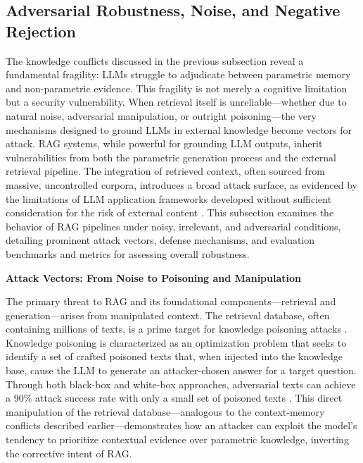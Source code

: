 \documentclass[11pt]{article}
\begin{document}
\subsection{Adversarial Robustness, Noise, and Negative Rejection}

The knowledge conflicts discussed in the previous subsection reveal a fundamental fragility: LLMs struggle to adjudicate between parametric memory and non-parametric evidence. This fragility is not merely a cognitive limitation but a security vulnerability. When retrieval itself is unreliable---whether due to natural noise, adversarial manipulation, or outright poisoning---the very mechanisms designed to ground LLMs in external knowledge become vectors for attack. RAG systems, while powerful for grounding LLM outputs, inherit vulnerabilities from both the parametric generation process and the external retrieval pipeline. The integration of retrieved context, often sourced from massive, uncontrolled corpora, introduces a broad attack surface, as evidenced by the limitations of LLM application frameworks developed without sufficient consideration for the risk of external content \cite{ref256}. This subsection examines the behavior of RAG pipelines under noisy, irrelevant, and adversarial conditions, detailing prominent attack vectors, defense mechanisms, and evaluation benchmarks and metrics for assessing overall robustness.

\textbf{Attack Vectors: From Noise to Poisoning and Manipulation}

The primary threat to RAG and its foundational components---retrieval and generation---arises from manipulated context. The retrieval database, often containing millions of texts, is a prime target for knowledge poisoning attacks \cite{ref257,ref256}. Knowledge poisoning is characterized as an optimization problem that seeks to identify a set of crafted poisoned texts that, when injected into the knowledge base, cause the LLM to generate an attacker-chosen answer for a target question. Through both black-box and white-box approaches, adversarial texts can achieve a 90\% attack success rate with only a small set of poisoned texts \cite{ref257}. This direct manipulation of the retrieval database---analogous to the context-memory conflicts described earlier---demonstrates how an attacker can exploit the model's tendency to prioritize contextual evidence over parametric knowledge, inverting the corrective intent of RAG.
\end{document}
